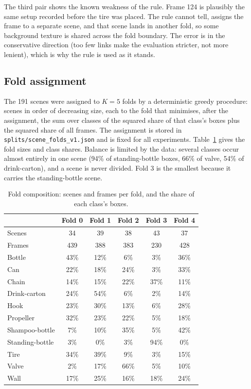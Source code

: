 \documentclass[11pt,a4paper]{article}
\begin{document}
The third pair shows the known weakness of the rule. Frame 124 is plausibly
the same setup recorded before the tire was placed. The rule cannot tell,
assigns the frame to a separate scene, and that scene lands in another fold,
so some background texture is shared across the fold boundary. The error is
in the conservative direction (too few links make the evaluation stricter,
not more lenient), which is why the rule is used as it stands.

\subsection{Fold assignment}

The 191 scenes were assigned to $K = 5$ folds by a deterministic greedy
procedure: scenes in order of decreasing size, each to the fold that
minimises, after the assignment, the sum over classes of the squared share
of that class's boxes plus the squared share of all frames. The assignment is
stored in \texttt{splits/scene\_folds\_v1.json} and is fixed for all
experiments. Table~\ref{tab:folds} gives the fold sizes and class shares.
Balance is limited by the data: several classes occur almost entirely in one
scene (94\% of standing-bottle boxes, 66\% of valve, 54\% of drink-carton),
and a scene is never divided. Fold 3 is the smallest because it carries the
standing-bottle scene.

\begin{table}[h]
  \centering
  \small
  \begin{tabular}{lccccc}
    \toprule
    & Fold 0 & Fold 1 & Fold 2 & Fold 3 & Fold 4 \\
    \midrule
    Scenes & 34 & 39 & 38 & 43 & 37 \\
    Frames & 439 & 388 & 383 & 230 & 428 \\
    \midrule
    Bottle & 43\% & 12\% & 6\% & 3\% & 36\% \\
    Can & 22\% & 18\% & 24\% & 3\% & 33\% \\
    Chain & 14\% & 15\% & 22\% & 37\% & 11\% \\
    Drink-carton & 24\% & 54\% & 6\% & 2\% & 14\% \\
    Hook & 23\% & 30\% & 13\% & 6\% & 28\% \\
    Propeller & 32\% & 23\% & 22\% & 5\% & 18\% \\
    Shampoo-bottle & 7\% & 10\% & 35\% & 5\% & 42\% \\
    Standing-bottle & 3\% & 0\% & 3\% & 94\% & 0\% \\
    Tire & 34\% & 39\% & 9\% & 3\% & 15\% \\
    Valve & 2\% & 17\% & 66\% & 5\% & 10\% \\
    Wall & 17\% & 25\% & 16\% & 18\% & 24\% \\
    \bottomrule
  \end{tabular}
  \caption{Fold composition: scenes and frames per fold, and the share of
  each class's boxes.}
  \label{tab:folds}
\end{table}
\end{document}
